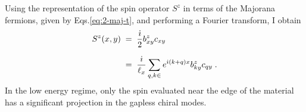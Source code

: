Using the representation of the spin operator $S^{z}$ in terms of the Majorana fermions, given by Eqs.\eqref{eq:2-maj-t}, and performing a Fourier transform, I obtain
\begin{align}
    S^{z} (x,y) \; &= \; \frac{\im}{2} b^{z}_{xy} c_{xy} \\[7pt]
    \; &= \;  \frac{\im}{\ell_x } \sum_{q ,k  \in }   e^{ \im (k+q) x} b^{z}_{ky}  c_{qy}  \; . %
\end{align}
In the low energy regime, only the spin evaluated near the edge of the material has a significant projection in the gapless chiral modes. %


